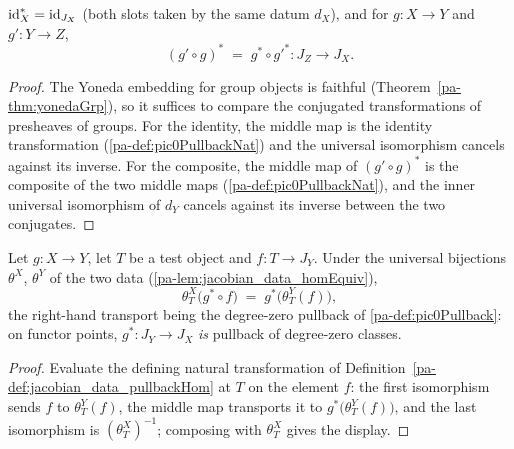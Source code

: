 \begin{theorem}
  \label{pa-thm:jacobian_data_pullbackHom_laws}
  \leanok

  \(\operatorname{id}_X^{*} = \operatorname{id}_{J_X}\) (both slots taken by the same datum \(d_X\)), and
  for \(g \colon X \to Y\) and \(g' \colon Y \to Z\),
  \[
    (g' \circ g)^{*} \;=\; g^{*} \circ g'^{*} \colon J_Z \longrightarrow J_X .
  \]
\end{theorem}
\begin{proof}
  \leanok
  The Yoneda embedding for group objects is faithful
  (Theorem~\ref{pa-thm:yonedaGrp}), so it suffices to compare the conjugated
  transformations of presheaves of groups. For the identity, the middle map is
  the identity transformation (\ref{pa-def:pic0PullbackNat}) and the universal
  isomorphism cancels against its inverse. For the composite, the middle map
  of \((g' \circ g)^{*}\) is the composite of the two middle maps
  (\ref{pa-def:pic0PullbackNat}), and the inner universal isomorphism of \(d_Y\)
  cancels against its inverse between the two conjugates.
\end{proof}

\begin{lemma}
  \label{pa-lem:jacobian_data_comp_pullbackHom}
  \leanok

  Let \(g \colon X \to Y\), let \(T\) be a test object and \(f \colon T \to
  J_Y\). Under the universal bijections \(\theta^X\), \(\theta^Y\) of the two
  data (\ref{pa-lem:jacobian_data_homEquiv}),
  \[
    \theta^X_T\bigl(g^{*} \circ f\bigr)
      \;=\; g^{*}\bigl(\theta^Y_T(f)\bigr),
  \]
  the right-hand transport being the degree-zero pullback of
  \ref{pa-def:pic0Pullback}: on functor points, \(g^{*} \colon J_Y \to J_X\)
  \emph{is} pullback of degree-zero classes.
\end{lemma}
\begin{proof}
  \leanok
  Evaluate the defining natural transformation of
  Definition~\ref{pa-def:jacobian_data_pullbackHom} at \(T\) on the element
  \(f\): the first isomorphism sends \(f\) to \(\theta^Y_T(f)\), the middle
  map transports it to \(g^{*}\bigl(\theta^Y_T(f)\bigr)\), and the last
  isomorphism is \((\theta^X_T)^{-1}\); composing with \(\theta^X_T\) gives
  the display.
\end{proof}

